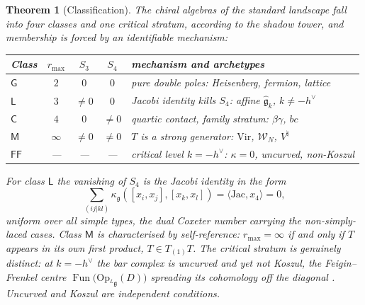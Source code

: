 \documentclass[11pt]{amsart}
\numberwithin{equation}{section}
\theoremstyle{plain}
\newtheorem{theorem}{Theorem}[section]
\theoremstyle{definition}
\theoremstyle{remark}
\newcommand{\cW}{\mathcal{W}}
\newcommand{\fg}{\mathfrak{g}}
\newcommand{\Vir}{\mathrm{Vir}}
\newcommand{\dvee}{h^{\vee}}
\begin{document}
\begin{theorem}[Classification]\label{thm:classification}
The chiral algebras of the standard landscape fall into four classes and
one critical stratum, according to the shadow tower, and membership is
forced by an identifiable mechanism:
\begin{center}
\begin{tabular}{lcccl}
\emph{Class} & $r_{\max}$ & $S_3$ & $S_4$ & \emph{mechanism and archetypes}\\
\hline
$\mathsf{G}$ & $2$ & $0$ & $0$ &
pure double poles: Heisenberg, fermion, lattice\\
$\mathsf{L}$ & $3$ & $\neq0$ & $0$ &
Jacobi identity kills $S_4$: affine $\widehat{\fg}_k$, $k\neq-\dvee$\\
$\mathsf{C}$ & $4$ & $0$ & $\neq0$ &
quartic contact, family stratum: $\beta\gamma$, $bc$\\
$\mathsf{M}$ & $\infty$ & $\neq0$ & $\neq0$ &
$T$ is a strong generator: $\Vir$, $\cW_N$, $V^{\natural}$\\
$\mathsf{FF}$ & --- & --- & --- &
critical level $k=-\dvee$: $\kappa=0$, uncurved, non-Koszul
\end{tabular}
\end{center}
For class $\mathsf{L}$ the vanishing of $S_4$ is the Jacobi identity in
the form
\[
\textstyle\sum_{(ij|kl)}\kappa_\fg([x_i,x_j],[x_k,x_l])
=\langle\mathrm{Jac},x_4\rangle=0,
\]
uniform over all simple types, the dual Coxeter number carrying the
non-simply-laced cases. Class $\mathsf{M}$ is characterised by
self-reference: $r_{\max}=\infty$ if and only if $T$ appears in its own
first product, $T\in T_{(1)}T$. The critical stratum is genuinely
distinct: at $k=-\dvee$ the bar complex is uncurved and yet not Koszul,
the Feigin--Frenkel centre
$\operatorname{Fun}\bigl(\mathrm{Op}_{{}^{L}\fg}(D)\bigr)$ spreading its
cohomology off the diagonal \cite{FF}. Uncurved and Koszul are
independent conditions.
\end{theorem}
\end{document}
